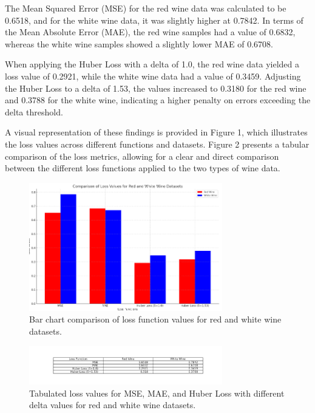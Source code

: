 \documentclass[12pt]{article}
\begin{document}
The Mean Squared Error (MSE) for the red wine data was calculated to be 0.6518, and for the white wine data, it was slightly higher at 0.7842. In terms of the Mean Absolute Error (MAE), the red wine samples had a value of 0.6832, whereas the white wine samples showed a slightly lower MAE of 0.6708.

When applying the Huber Loss with a delta of 1.0, the red wine data yielded a loss value of 0.2921, while the white wine data had a value of 0.3459. Adjusting the Huber Loss to a delta of 1.53, the values increased to 0.3180 for the red wine and 0.3788 for the white wine, indicating a higher penalty on errors exceeding the delta threshold.

A visual representation of these findings is provided in Figure 1, which illustrates the loss values across different functions and datasets. Figure 2 presents a tabular comparison of the loss metrics, allowing for a clear and direct comparison between the different loss functions applied to the two types of wine data.

\begin{figure}[H]
    \centering
    \includegraphics[width=0.75\textwidth]{Graph.png}
    \caption{Bar chart comparison of loss function values for red and white wine datasets.}
    \label{fig:loss_functions_graph}
\end{figure}

\begin{figure}[H]
    \centering
    \includegraphics[width=0.75\textwidth]{Sheet.png}
    \caption{Tabulated loss values for MSE, MAE, and Huber Loss with different delta values for red and white wine datasets.}
    \label{fig:loss_functions_sheet}
\end{figure}
\end{document}
